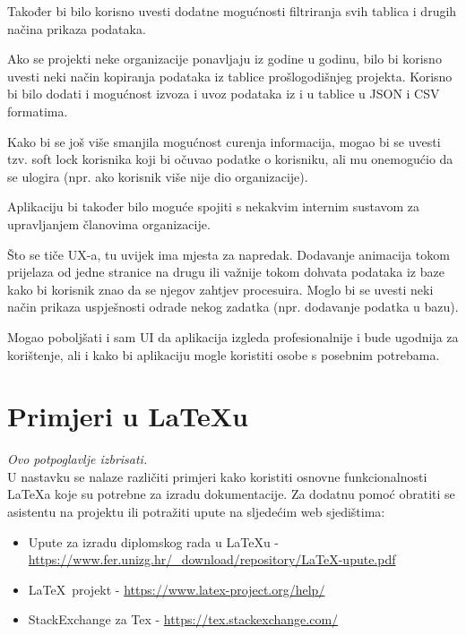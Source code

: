		{Također bi bilo korisno uvesti dodatne mogućnosti filtriranja svih tablica i drugih načina prikaza podataka.}\vspace{0.1cm}
		
		{Ako se projekti neke organizacije ponavljaju iz godine u godinu, bilo bi korisno uvesti neki način kopiranja podataka iz tablice prošlogodišnjeg projekta. Korisno bi bilo dodati i mogućnost izvoza i uvoz podataka iz i u tablice u JSON i CSV formatima.}\vspace{0.1cm}
		
		{Kako bi se još više smanjila mogućnost curenja informacija, mogao bi se uvesti tzv. soft lock korisnika koji bi očuvao podatke o korisniku, ali mu onemogućio da se ulogira (npr. ako korisnik više nije dio organizacije).}\vspace{0.1cm}
		
		{Aplikaciju bi također bilo moguće spojiti s nekakvim internim sustavom za upravljanjem članovima organizacije.}\vspace{0.1cm}
		
		{Što se tiče UX-a, tu uvijek ima mjesta za napredak. Dodavanje animacija tokom prijelaza od jedne stranice na drugu ili važnije tokom dohvata podataka iz baze kako bi korisnik znao da se njegov zahtjev procesuira. Moglo bi se uvesti neki način prikaza uspješnosti odrade nekog zadatka (npr. dodavanje podatka u bazu).}
		
		{Mogao poboljšati i sam UI da aplikacija izgleda profesionalnije i bude ugodnija za korištenje, ali i kako bi aplikaciju mogle koristiti osobe s posebnim potrebama.}\vspace{0.1cm}

		\eject

\iffalse %

		\section{Primjeri u \LaTeX u}
		
		\textit{Ovo potpoglavlje izbrisati.}\\

		U nastavku se nalaze različiti primjeri kako koristiti osnovne funkcionalnosti \LaTeX a koje su potrebne za izradu dokumentacije. Za dodatnu pomoć obratiti se asistentu na projektu ili potražiti upute na sljedećim web sjedištima:
		\begin{itemize}
			\item Upute za izradu diplomskog rada u \LaTeX u - \url{https://www.fer.unizg.hr/_download/repository/LaTeX-upute.pdf}
			\item \LaTeX\ projekt - \url{https://www.latex-project.org/help/}
			\item StackExchange za Tex - \url{https://tex.stackexchange.com/}\\
		
		\end{itemize} 	

